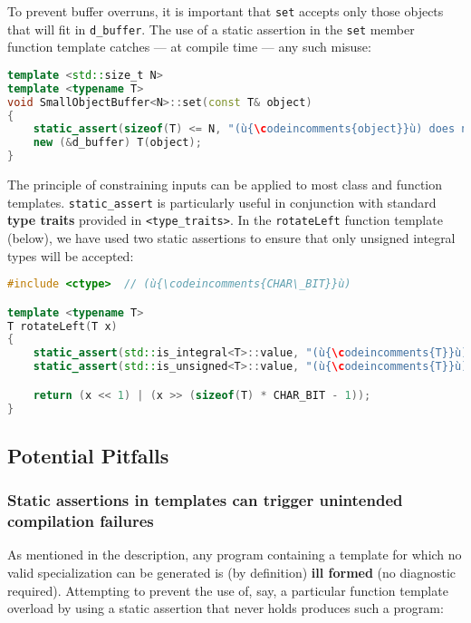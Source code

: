 \noindent To prevent buffer overruns, it is important that \texttt{set} accepts
only those objects that will fit in \texttt{d\_buffer}. The use of a
static assertion in the \texttt{set} member function template catches
--- at compile time --- any such misuse:

\begin{lstlisting}[language=C++]
template <std::size_t N>
template <typename T>
void SmallObjectBuffer<N>::set(const T& object)
{
    static_assert(sizeof(T) <= N, "(ù{\codeincomments{object}}ù) does not fit in the small buffer.");
    new (&d_buffer) T(object);
}
\end{lstlisting}
    

The principle of constraining inputs can be applied to most class and
function templates. \texttt{static\_assert} is particularly useful in
conjunction with standard \textbf{type traits} provided in
\texttt{<type\_traits>}. In the \texttt{rotateLeft} function template
(below), we have used two static assertions to ensure that only unsigned
integral types will be accepted:

\begin{lstlisting}[language=C++]
#include <ctype>  // (ù{\codeincomments{CHAR\_BIT}}ù)

template <typename T>
T rotateLeft(T x)
{
    static_assert(std::is_integral<T>::value, "(ù{\codeincomments{T}}ù) must be an integral type.");
    static_assert(std::is_unsigned<T>::value, "(ù{\codeincomments{T}}ù) must be an unsigned type.");

    return (x << 1) | (x >> (sizeof(T) * CHAR_BIT - 1));
}
\end{lstlisting}
    

\subsection[Potential Pitfalls]{Potential Pitfalls}\label{static-potential-pitfalls}

\subsubsection[Static assertions in templates can trigger unintended compilation failures]{Static assertions in templates can trigger unintended compilation failures}\label{static-assertions-in-templates-can-trigger-unintended-compilation-failures}

As mentioned in the description, any program containing a template for
which no valid specialization can be generated is (by definition)
\textbf{ill formed} (no diagnostic required). Attempting to prevent the
use of, say, a particular function template overload by using a static
assertion that never holds produces such a program:

